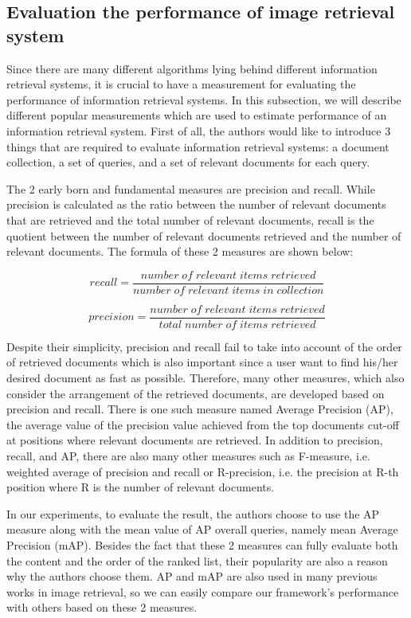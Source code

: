 \subsection{Evaluation the performance of image retrieval system} \label{section:evaluation_ir_sys}

Since there are many different algorithms lying behind different information retrieval systems, it is crucial to have a measurement for evaluating the performance of information retrieval systems. In this subsection, we will describe different popular measurements which are used to estimate performance of an information retrieval system. First of all, the authors would like to introduce 3 things that are required to evaluate information retrieval systems: a document collection, a set of queries, and a set of relevant documents for each query.

The 2 early born and fundamental measures are precision and recall. While precision is calculated as the ratio between the number of relevant documents that are retrieved and the total number of relevant documents, recall is the quotient between the number of relevant documents retrieved and the number of relevant documents. The formula of these 2 measures are shown below:

\begin{equation}
recall = \frac{number\;of\;relevant\;items\;retrieved}{number\;of\;relevant\;items\;in\;collection}
\end{equation}

\begin{equation}
precision = \frac{number\;of\;relevant\;items\;retrieved}{total\;number\;of\;items\;retrieved}
\end{equation}

Despite their simplicity, precision and recall fail to take into account of the order of retrieved documents which is also important since a user want to find his/her desired document as fast as possible. Therefore, many other measures, which also consider the arrangement of the retrieved documents, are developed based on precision and recall. There is one such measure named Average Precision (AP), the average value of the precision value achieved from the top documents cut-off at positions where relevant documents are retrieved. In addition to precision, recall, and AP, there are also many other measures such as F-measure, i.e. weighted average of precision and recall or R-precision, i.e. the precision at R-th position where R is the number of relevant documents.

In our experiments, to evaluate the result, the authors choose to use the AP measure along with the mean value of AP overall queries, namely mean Average Precision (mAP). Besides the fact that these 2 measures can fully evaluate both the content and the order of the ranked list, their popularity are also a reason why the authors choose them. AP and mAP are also used in many previous works in image retrieval, so we can easily compare our framework's performance with others based on these 2 measures.
